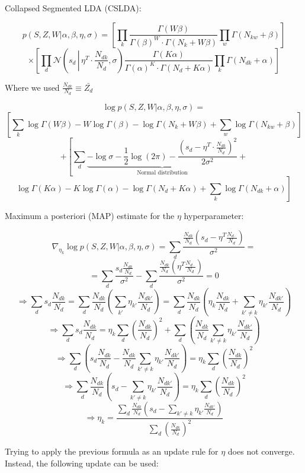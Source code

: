 \documentclass[a4paper,10pt]{report}
\title{}
\author{}
\begin{document}
Collapsed Segmented LDA (CSLDA):

$$ p(S, Z, W | \alpha, \beta, \eta, \sigma) = \left[ \prod_k \frac{\Gamma(W \beta)}{\Gamma(\beta)^W \cdot \Gamma(N_k + W \beta)} \prod_w \Gamma(N_{kw} + \beta) \right] $$
$$ \times \left[ \prod_d \mathcal{N}\left(s_d\, \left|\, \eta^T \cdot \frac{N_{dk}}{N_d}, \sigma\right. \right) \frac{\Gamma(K \alpha)}{\Gamma(\alpha)^K \cdot \Gamma(N_d + K \alpha)} \prod_k \Gamma(N_{dk} + \alpha) \right] $$

Where we used $ \frac{N_{dk}}{N_d} \equiv \bar{Z_d} $

$$ \log p(S, Z, W | \alpha, \beta, \eta, \sigma) = $$
$$ \left[ \sum_k \log \Gamma(W \beta) - W \log \Gamma(\beta) - \log \Gamma(N_k + W \beta) + \sum_w \log \Gamma(N_{kw} + \beta) \right] $$
$$ + \left[ \sum_d \underbrace{- \log \sigma - \frac{1}{2} \log(2 \pi) - \frac{\left(s_d - \eta^T \cdot \frac{N_{dk}}{N_d}\right)^2}{2 \sigma^2}}_{\text{Normal distribution}} + \right. $$
$$ \left. \log \Gamma(K \alpha) - K \log \Gamma(\alpha) - \log \Gamma(N_d + K \alpha) + \sum_k \log \Gamma(N_{dk} + \alpha) \right] $$

Maximum a posteriori (MAP) estimate for the $\eta$ hyperparameter:

$$ \nabla_{\eta_k} \log p(S, Z, W | \alpha, \beta, \eta, \sigma) = \sum_d \frac{ \frac{N_{dk}}{N_d} \left( s_d - \eta^T \frac{N_{d\cdot}}{N_d}\right) }{\sigma^2} = $$
$$ = \sum_d \frac{s_d \frac{N_{dk}}{N_d} }{\sigma^2} - \sum_d \frac{ \frac{N_{dk}}{N_d} \left( \eta^T \frac{N_{d\cdot}}{N_d} \right) }{\sigma^2} = 0 $$
$$ \Rightarrow \sum_d s_d \frac{N_{dk}}{N_d} = \sum_d \frac{N_{dk}}{N_d} \left( \sum_{k'} \eta_{k'} \frac{N_{dk'}}{N_d} \right) = \sum_d \frac{N_{dk}}{N_d} \left( \eta_k \frac{N_{dk}}{N_d} + \sum_{k' \ne k} \eta_{k'} \frac{N_{dk'}}{N_d} \right) $$
$$ \Rightarrow \sum_d s_d \frac{N_{dk}}{N_d} = \eta_k \sum_d \left( \frac{N_{dk}}{N_d}  \right)^2 + \sum_d \left( \frac{N_{dk}}{N_d} \sum_{k' \ne k} \eta_{k'} \frac{N_{dk'}}{N_d} \right) $$
$$ \Rightarrow \sum_d \left( s_d \frac{N_{dk}}{N_d} - \frac{N_{dk}}{N_d} \sum_{k' \ne k} \eta_{k'} \frac{N_{dk'}}{N_d} \right) = \eta_k \sum_d \left( \frac{N_{dk}}{N_d}  \right)^2 $$
$$ \Rightarrow \sum_d \frac{N_{dk}}{N_d} \left( s_d - \sum_{k' \ne k} \eta_{k'} \frac{N_{dk'}}{N_d} \right) = \eta_k \sum_d \left( \frac{N_{dk}}{N_d}  \right)^2 $$
$$ \Rightarrow \eta_k = \frac{\sum_d \frac{N_{dk}}{N_d} \left( s_d - \sum_{k' \ne k} \eta_{k'} \frac{N_{dk'}}{N_d} \right)}{\sum_d \left( \frac{N_{dk}}{N_d}  \right)^2} $$

Trying to apply the previous formula as an update rule for $\eta$ does not converge. Instead, the following update can be used:
\end{document}
